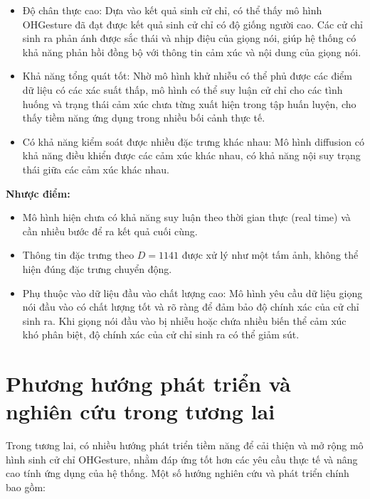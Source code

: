 \begin{itemize}
	\item Độ chân thực cao: Dựa vào kết quả sinh cử chỉ, có thể thấy mô hình OHGesture đã đạt được kết quả sinh cử chỉ có độ giống người cao. Các cử chỉ sinh ra phản ánh được sắc thái và nhịp điệu của giọng nói, giúp hệ thống có khả năng phản hồi đồng bộ với thông tin cảm xúc và nội dung của giọng nói.
	
	\item Khả năng tổng quát tốt: Nhờ mô hình khử nhiễu có thể phủ được các điểm dữ liệu có các xác suất thấp, mô hình có thể suy luận cử chỉ cho các tình huống và trạng thái cảm xúc chưa từng xuất hiện trong tập huấn luyện, cho thấy tiềm năng ứng dụng trong nhiều bối cảnh thực tế.
	
	\item Có khả năng kiểm soát được nhiều đặc trưng khác nhau: Mô hình diffusion có khả năng điều khiển được các cảm xúc khác nhau, có khả năng nội suy trạng thái giữa các cảm xúc khác nhau.
	\end{itemize}

\textbf{Nhược điểm:}

\begin{itemize}
	\item Mô hình hiện chưa có khả năng suy luận theo thời gian thực (real time) và cần nhiều bước để ra kết quả cuối cùng.
	
	\item Thông tin đặc trưng theo $D=1141$ được xử lý như một tấm ảnh, không thể hiện đúng đặc trưng chuyển động.
	
	\item Phụ thuộc vào dữ liệu đầu vào chất lượng cao: Mô hình yêu cầu dữ liệu giọng nói đầu vào có chất lượng tốt và rõ ràng để đảm bảo độ chính xác của cử chỉ sinh ra. Khi giọng nói đầu vào bị nhiễu hoặc chứa nhiều biến thể cảm xúc khó phân biệt, độ chính xác của cử chỉ sinh ra có thể giảm sút.
	
	
\end{itemize}


\section{Phương hướng phát triển và nghiên cứu trong tương lai}


Trong tương lai, có nhiều hướng phát triển tiềm năng để cải thiện và mở rộng mô hình sinh cử chỉ OHGesture, nhằm đáp ứng tốt hơn các yêu cầu thực tế và nâng cao tính ứng dụng của hệ thống. Một số hướng nghiên cứu và phát triển chính bao gồm:

